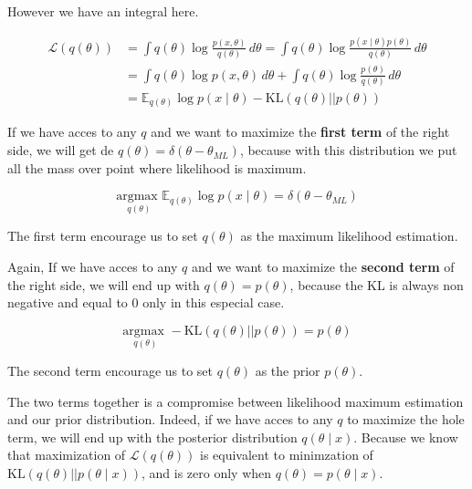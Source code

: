 \vspace{0.3cm}

However we have an integral here. 

\begin{equation}
 \begin{split}
  \mathcal{L}(q(\theta)) & = \int q(\theta) \log \frac{p(x,\theta)}{q(\theta)} \, d\theta = \int q(\theta) \log \frac{p(x\mid \theta)p(\theta)}{q(\theta)} \, d\theta \\
  & = \int q(\theta) \log p(x,\theta) \, d\theta + \int q(\theta) \log \frac{p(\theta)}{q(\theta)} \, d\theta  \\
  & = \mathbb{E}_{q(\theta)} \log p(x \mid \theta) - \text{KL}(q(\theta)||p(\theta))
 \end{split}
\end{equation}

If we have acces to any $q$ and we want to maximize the \textbf{first term} of the right side, we will get de $q(\theta) = \delta(\theta - \theta_{ML})$, because with this distribution we put all the mass over point where likelihood is maximum.

\begin{equation}
  \underset{q(\theta)}{\text{argmax }} \mathbb{E}_{q(\theta)} \log p(x \mid \theta) = \delta(\theta - \theta_{ML})
\end{equation}
 
The first term encourage us to set $q(\theta)$ as the maximum likelihood estimation.

\vspace{0.3cm}

Again, If we have acces to any $q$ and we want to maximize the \textbf{second term} of the right side, we will end up with $q(\theta) = p(\theta)$, because the KL is always non negative and equal to 0 only in this especial case.

\begin{equation}
  \underset{q(\theta)}{\text{argmax }} - \text{KL}(q(\theta)||p(\theta)) = p(\theta)
\end{equation}

The second term encourage us to set $q(\theta)$ as the prior $p(\theta)$.

\vspace{0.3cm}

The two terms together is a compromise between likelihood maximum estimation and our prior distribution.
Indeed, if we have acces to any $q$ to maximize the hole term, we will end up with the posterior distribution $q(\theta \mid x)$.
Because we know that maximization of $\mathcal{L}(q(\theta))$ is equivalent to minimzation of $\text{KL}(q(\theta)||p(\theta\mid x))$, and is zero only when $q(\theta) = p(\theta \mid x)$.


